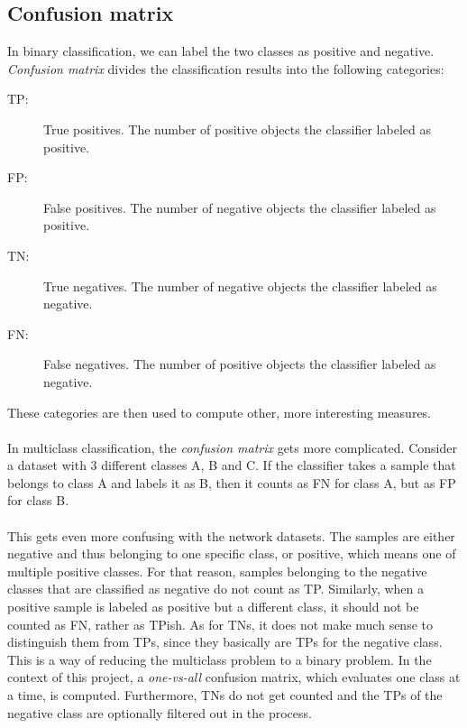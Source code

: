\documentclass[11pt]{article}
\begin{document}
      \subsection{Confusion matrix}
        In binary classification, we can label the two classes as positive and negative. {\it Confusion matrix}\cite{confusion} divides the classification results into the following categories:
        \begin{description}
        \item [TP:]   True positives. The number of positive objects the classifier labeled as positive.
        \item [FP:]   False positives. The number of negative objects the classifier labeled as positive.
        \item [TN:]   True negatives. The number of negative objects the classifier labeled as negative.
        \item [FN:]   False negatives. The number of positive objects the classifier labeled as negative.
        \end{description}
        These categories are then used to compute other, more interesting measures.
        \\~\\
        In multiclass classification, the {\it confusion matrix} gets more complicated. Consider a dataset with 3 different classes A, B and C. If the classifier takes a sample that belongs to class A and labels it as B, then it counts as FN for class A, but as FP for class B.
        \\~\\
        This gets even more confusing with the network datasets. The samples are either negative and thus belonging to one specific class, or positive, which means one of multiple positive classes. For that reason, samples belonging to the negative classes that are classified as negative do not count as TP. Similarly, when a positive sample is labeled as positive but a different class, it should not be counted as FN, rather as TPish. As for TNs, it does not make much sense to distinguish them from TPs, since they basically are TPs for the negative class. This is a way of reducing the multiclass problem to a binary problem. In the context of this project, a {\it one-vs-all} confusion matrix, which evaluates one class at a time, is computed. Furthermore, TNs do not get counted and the TPs of the negative class are optionally filtered out in the process.
\end{document}
